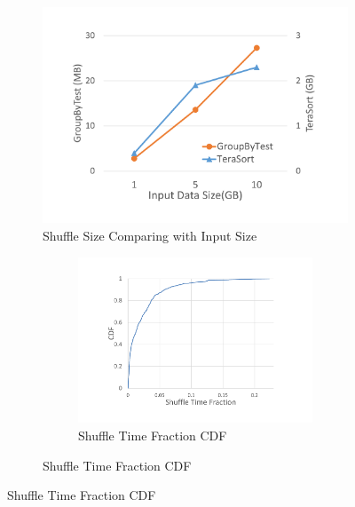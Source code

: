 \begin{figure}
	\centering
	\begin{minipage}{0.34\linewidth}
		\begin{figure}[H]
			\includegraphics[width=\textwidth]{fig/shuffle_size}
			\caption{Shuffle Size Comparing with Input Size}
			\label{fig:shuffle_size}
		\end{figure}
	\end{minipage}
	\begin{minipage}{0.65\linewidth}
		\begin{figure}[H]
			\begin{subfigure}{0.5\textwidth}
				\includegraphics[width=\linewidth]{fig/reduce_cdf}
				\caption{Shuffle Time Fraction CDF}
				\label{fig:cdf}
			\end{subfigure}	

\end{figure}
\end{minipage}
\end{figure}
